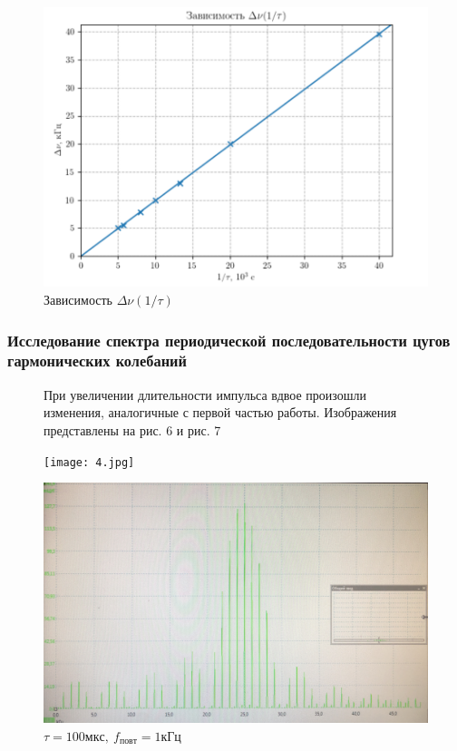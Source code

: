 \documentclass[12pt,a4paper]{article}
\begin{document}
\begin{figure}[h!]
    \centering
    \includegraphics[width=0.7\linewidth]{dv(1:t).png}
    \caption{Зависимость $\Delta \nu (1/\tau)$}
\end{figure}

\newpage

\subsubsection*{Исследование спектра периодической последовательности цугов гармонических колебаний}

\begin{figure}[htp]
    При увеличении длительности импульса вдвое произошли изменения, аналогичные с первой частью работы.
    Изображения представлены на рис. 6 и рис. 7
    \newline

    \centering
    \texttt{[image: 4.jpg]}
    \caption[]{$\tau = 50мкс,\ f_{повт} = 1кГц$}

    \includegraphics[width=0.7\linewidth]{5.jpg}
    \caption[]{$\tau = 100мкс,\ f_{повт} = 1кГц$}
\end{figure}
\end{document}
